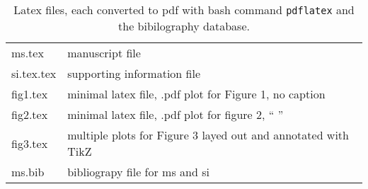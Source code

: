 \begin{table*}[ht]
\caption{
  Latex files, each converted to pdf with bash command {\tt pdflatex}
  and the bibilography database.
}
\centering
\begin{tabular}{ll} \hline
    ms.tex  & manuscript file \\
    si.tex.tex & supporting information file \\
    fig1.tex  & minimal latex file, .pdf plot for Figure 1, no caption \\
    fig2.tex  & minimal latex file, .pdf plot for figure 2, `` ''  \\
    fig3.tex  & multiple plots for Figure 3 layed out and annotated with TikZ\\
    ms.bib  & bibliograpy file for ms and si \\ \hline
\end{tabular}
\end{table*}
